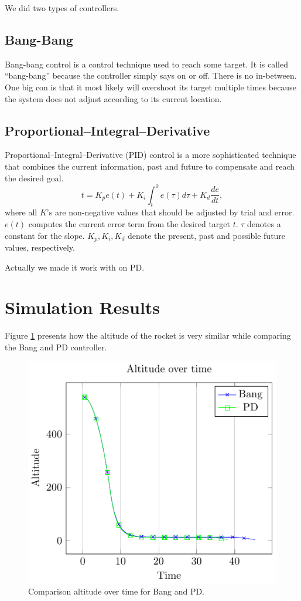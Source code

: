 \documentclass[
]{dtuposter}
\begin{document}
\begin{dtupostercontent}
We did two types of controllers.

\subsection{Bang-Bang}

Bang-bang control is a control technique used to reach some target.
It is called ``bang-bang'' because the controller simply says on or off.
There is no in-between.
One big con is that it most likely will overshoot its target multiple times because the system does not adjust according to its current location.

\subsection{Proportional–Integral–Derivative}

Proportional–Integral–Derivative (PID) control is a more sophisticated technique that combines the current information, past and future to compensate and reach the desired goal.
%
\[
  t = K_p e(t) + K_i \int_{t}^{0} e(\tau{}) d\tau{} + K_d \frac{de}{dt},
\]
%
where all $K$'s are non-negative values that should be adjusted by trial and error.
$e(t)$ computes the current error term from the desired target $t$.
$\tau$ denotes a constant for the slope.
$K_p, K_i, K_d$ denote the present, past and possible future values, respectively.

Actually we made it work with on PD.

\section{Simulation Results}

Figure \ref{fig:altitude} presents how the altitude of the rocket is very similar while comparing the Bang and PD controller.

\begin{figure}
  \includegraphics[width=\linewidth,origin=c]{altitude.pdf}
  \caption{Comparison altitude over time for Bang and PD.}
  \label{fig:altitude}
\end{figure}


\end{dtupostercontent}
\end{document}
